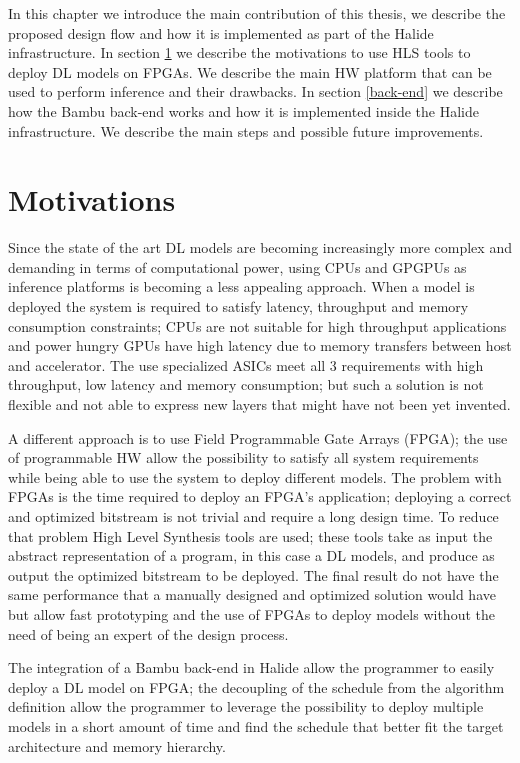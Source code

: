 \documentclass[../main.tex]{subfiles}
\begin{document}
In this chapter we introduce the main contribution of this thesis, we describe the proposed design flow and how it is implemented as part of the Halide infrastructure. 
In section \ref{motivations} we describe the motivations to use HLS tools to deploy DL models on FPGAs. We describe the main HW platform that can be used to perform inference and their drawbacks. 
In section \ref{back-end} we describe how the Bambu back-end works and how it is implemented inside the Halide infrastructure. We describe the main steps and possible future improvements.
\newpage

\section{Motivations}
\label {motivations}
Since the state of the art DL models are becoming increasingly more complex and demanding in terms of computational power, using CPUs and GPGPUs as inference platforms is becoming a less appealing approach. 
When a model is deployed the system is required to satisfy latency, throughput and memory consumption constraints; CPUs are not suitable for high throughput applications and power hungry GPUs have high latency due to memory transfers between host and accelerator.
The use specialized ASICs meet all 3 requirements with high throughput, low latency and memory consumption; but such a solution is not flexible and not able to express new layers that might have not been yet invented.

A different approach is to use Field Programmable Gate Arrays (FPGA); the use of programmable HW allow the possibility to satisfy all system requirements while being able to use the system to deploy different models.
The problem with FPGAs is the time required to deploy an FPGA's application; deploying a correct and optimized bitstream is not trivial and require a long design time. To reduce that problem High Level Synthesis tools are used; these tools take as input the abstract representation of a program, in this case a DL models, and produce as output the optimized bitstream to be deployed. The final result do not have the same performance that a manually designed and optimized solution would have but allow fast prototyping and the use of FPGAs to deploy models without the need of being an expert of the design process.

The integration of a Bambu back-end in Halide allow the programmer to easily deploy a DL model on FPGA; the decoupling of the schedule from the algorithm definition allow the programmer to leverage the possibility to deploy multiple models in a short amount of time and find the schedule that better fit the target architecture and memory hierarchy.
\end{document}
